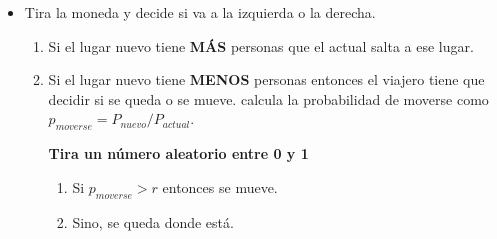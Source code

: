 \documentclass[
  12pt,
]{book}
\providecommand{\tightlist}{%
  \setlength{\itemsep}{0pt}\setlength{\parskip}{0pt}}
\theoremstyle{definition}
\theoremstyle{definition}
\theoremstyle{definition}
\theoremstyle{definition}
\theoremstyle{remark}
\begin{document}
\begin{itemize}
\tightlist
\item
  Tira la moneda y decide si va a la izquierda o la derecha.

  \begin{enumerate}
  \def\labelenumi{\arabic{enumi}.}
  \item
    Si el lugar nuevo tiene \textbf{MÁS} personas que el actual salta a ese lugar.
  \item
    Si el lugar nuevo tiene \textbf{MENOS} personas entonces el viajero tiene que decidir si se queda o se mueve. \textbar{} calcula la probabilidad de moverse como \(p_{moverse} = P_{nuevo}/P_{actual}\).

    \textbf{Tira un número aleatorio entre 0 y 1}

    \begin{enumerate}
    \def\labelenumii{\arabic{enumii}.}
    \tightlist
    \item
      Si \(p_{moverse}>r\) entonces se mueve.
    \item
      Sino, se queda donde está.
    \end{enumerate}
  \end{enumerate}
\end{itemize}
\end{document}
